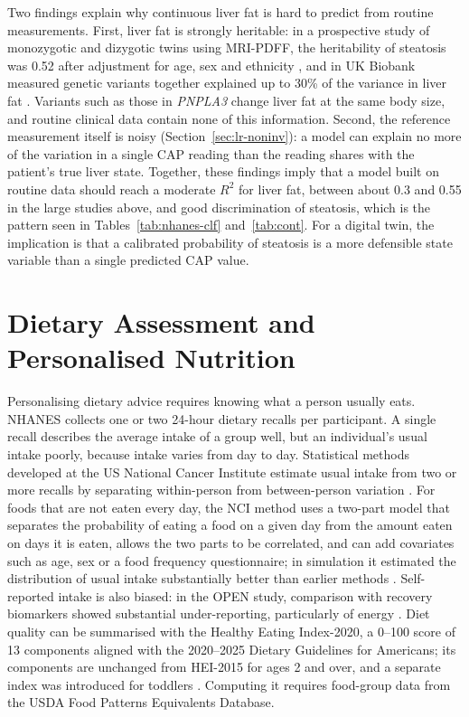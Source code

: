 Two findings explain why continuous liver fat is hard to predict from routine measurements. First, liver fat is strongly heritable: in a prospective study of monozygotic and dizygotic twins using MRI-PDFF, the heritability of steatosis was 0.52 after adjustment for age, sex and ethnicity \cite{loomba2015heritability}, and in UK Biobank measured genetic variants together explained up to 30\% of the variance in liver fat \cite{haas2021liverfat}. Variants such as those in \emph{PNPLA3} change liver fat at the same body size, and routine clinical data contain none of this information. Second, the reference measurement itself is noisy (Section~\ref{sec:lr-noninv}): a model can explain no more of the variation in a single CAP reading than the reading shares with the patient's true liver state. Together, these findings imply that a model built on routine data should reach a moderate $R^2$ for liver fat, between about 0.3 and 0.55 in the large studies above, and good discrimination of steatosis, which is the pattern seen in Tables~\ref{tab:nhanes-clf} and~\ref{tab:cont}. For a digital twin, the implication is that a calibrated probability of steatosis is a more defensible state variable than a single predicted CAP value.

\section{Dietary Assessment and Personalised Nutrition}
\label{sec:lr-diet}

Personalising dietary advice requires knowing what a person usually eats. NHANES collects one or two 24-hour dietary recalls per participant. A single recall describes the average intake of a group well, but an individual's usual intake poorly, because intake varies from day to day. Statistical methods developed at the US National Cancer Institute estimate usual intake from two or more recalls by separating within-person from between-person variation \cite{dodd2006usual}. For foods that are not eaten every day, the NCI method uses a two-part model that separates the probability of eating a food on a given day from the amount eaten on days it is eaten, allows the two parts to be correlated, and can add covariates such as age, sex or a food frequency questionnaire; in simulation it estimated the distribution of usual intake substantially better than earlier methods \cite{tooze2006usual}. Self-reported intake is also biased: in the OPEN study, comparison with recovery biomarkers showed substantial under-reporting, particularly of energy \cite{subar2003open}. Diet quality can be summarised with the Healthy Eating Index-2020, a 0--100 score of 13 components aligned with the 2020--2025 Dietary Guidelines for Americans; its components are unchanged from HEI-2015 for ages 2 and over, and a separate index was introduced for toddlers \cite{shamswhite2023hei}. Computing it requires food-group data from the USDA Food Patterns Equivalents Database.

